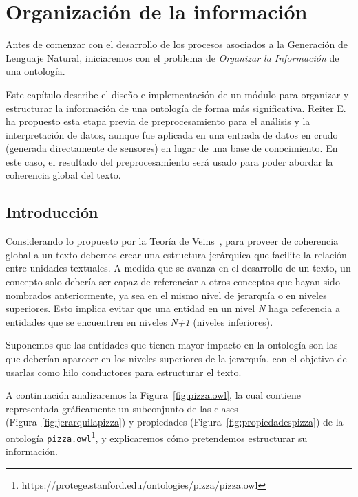 \chapter{Organización de la información\label{cap:organizacion}}

Antes de comenzar con el desarrollo de los procesos asociados a la Generación de Lenguaje Natural, iniciaremos con el problema de \textit{Organizar la Información} de una ontología.  

Este capítulo describe el diseño e implementación de un módulo para organizar y estructurar la información de una ontología de forma más significativa. Reiter E.~\cite{reiter2007architecture} ha propuesto esta etapa previa de preprocesamiento para el análisis y la interpretación de datos, aunque fue aplicada en una entrada de datos en crudo (generada directamente de sensores) en lugar de una base de conocimiento. En este caso, el resultado del preprocesamiento será usado para poder abordar la coherencia global del texto.

\section{Introducción}
Considerando lo propuesto por la Teoría de Veins~\cite{cristea1998veins}, para proveer de coherencia global a un texto debemos crear una estructura jerárquica que facilite la relación entre unidades textuales. A medida que se avanza en el desarrollo de un texto, un concepto solo debería ser capaz de referenciar a otros conceptos que hayan sido nombrados anteriormente, ya sea en el mismo nivel de jerarquía o en niveles superiores. Esto implica evitar que una entidad en un nivel \emph{N} haga referencia a entidades que se encuentren en niveles \emph{N+1} (niveles inferiores). 

Suponemos que las entidades que tienen mayor impacto en la ontología son las que deberían aparecer en los niveles superiores de la jerarquía, con el objetivo de usarlas como hilo conductores para estructurar el texto. 


A continuación analizaremos la Figura~\ref{fig:pizza.owl}, la cual contiene representada gráficamente un subconjunto de las clases (Figura~\ref{fig:jerarquilapizza}) y propiedades (Figura~\ref{fig:propiedadespizza}) de la ontología {\tt pizza.owl}\footnote{https://protege.stanford.edu/ontologies/pizza/pizza.owl}, y explicaremos cómo pretendemos estructurar su información.

